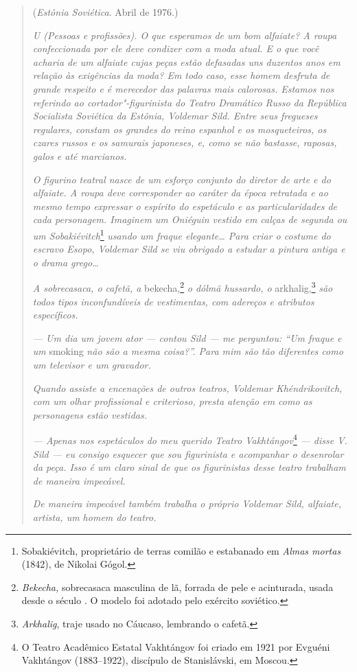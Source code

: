 \begin{quotation}
\begin{flushright}
(\emph{Estônia Soviética}. Abril de 1976.)
\end{flushright}
\vspace{4pt}
\noindent\emph{U (Pessoas e profissões). O que esperamos
de um bom alfaiate? A roupa confeccionada por ele deve condizer com a
moda atual. E o que você acharia de um alfaiate cujas peças estão
defasadas uns duzentos anos em relação às exigências da moda? Em todo
caso, esse homem desfruta de grande respeito e é merecedor das palavras
mais calorosas. Estamos nos referindo ao cortador"-figurinista do Teatro
Dramático Russo da República Socialista Soviética da Estônia, Voldemar
Sild. Entre seus fregueses regulares, constam os grandes do reino
espanhol e os mosqueteiros, os czares russos e os samurais japoneses, e,
como se não bastasse, raposas, galos e até marcianos.}

\emph{O figurino teatral nasce de um esforço conjunto do diretor de arte
e do alfaiate. A roupa deve corresponder ao caráter da época retratada e
ao mesmo tempo expressar o espírito do espetáculo e as particularidades
de cada personagem. Imaginem um Oniéguin vestido em calças de segunda ou
um Sobakiévitch}\footnote{Sobakiévitch, proprietário de terras comilão e
  estabanado em \emph{Almas mortas} (1842), de Nikolai Gógol.}
\emph{usando um fraque elegante\ldots{} Para criar o costume do escravo
Esopo, Voldemar Sild se viu obrigado a estudar a pintura antiga e o
drama grego\ldots{}}

\emph{A sobrecasaca, o cafetã, a} bekecha,\footnote{\emph{Bekecha,}
  sobrecasaca masculina de lã, forrada de pele e acinturada, usada desde
  o século . O modelo foi adotado pelo exército soviético.} \emph{o
dólmã hussardo, o} arkhalig,\footnote{\emph{Arkhalig}, traje
  usado no Cáucaso, lembrando o cafetã.} \emph{são todos tipos
inconfundíveis de vestimentas, com adereços e atributos específicos.}

\emph{--- Um dia um jovem ator --- contou Sild --- me perguntou: ``Um
fraque e um} smoking \emph{não são a mesma coisa?''. Para mim são tão
diferentes como um televisor e um gravador.}

\emph{Quando assiste a encenações de outros teatros, Voldemar
Khéndrikovitch, com um olhar profissional e criterioso, presta atenção
em como as personagens estão vestidas.}

\emph{--- Apenas nos espetáculos do meu querido Teatro
Vakhtángov}\footnote{O Teatro Acadêmico Estatal Vakhtángov foi criado em
  1921 por Evguéni Vakhtángov (1883--1922), discípulo de Stanislávski,
  em Moscou.} \emph{--- disse V. Sild --- eu consigo esquecer que sou
figurinista e acompanhar o desenrolar da peça. Isso é um claro sinal de
que os figurinistas desse teatro trabalham de maneira impecável.}

\emph{De maneira impecável também trabalha o próprio Voldemar Sild,
alfaiate, artista, um homem do teatro.}
\end{quotation}

